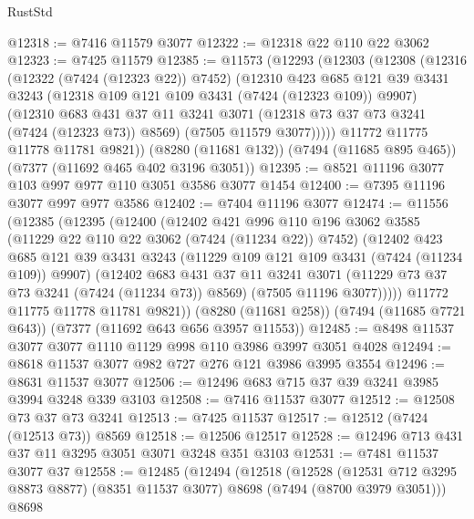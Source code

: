 \begin{lexlean}{RustStd}
\begin{coremodule}
{\begin{coremodule}
{{{{{{{{{{{{{{{{{{{{{{{{{{{{{{{{@12318 := @7416 @11579 @3077
@12322 := @12318 @22 @110 @22 @3062
@12323 := @7425 @11579
@12385 := @11573
    (@12293
      (@12303
        (@12308
          (@12316
            (@12322 (@7424 (@12323 @22)) @7452)
            (@12310
              @423
              @685
              @121
              @39
              @3431
              @3243
              (@12318 @109 @121 @109 @3431 (@7424 (@12323 @109)) @9907)
              (@12310
                @683
                @431
                @37
                @11
                @3241
                @3071
                (@12318 @73 @37 @73 @3241 (@7424 (@12323 @73)) @8569)
                (@7505 @11579 @3077)))))
        @11772
        @11775
        @11778
        @11781
        @9821))
    (@8280 (@11681 @132))
    (@7494 (@11685 @895 @465))
    (@7377 (@11692 @465 @402 @3196 @3051))
@12395 := @8521 @11196 @3077 @103 @997 @977 @110 @3051 @3586 @3077 @1454
@12400 := @7395 @11196 @3077 @997 @977 @3586
@12402 := @7404 @11196 @3077
@12474 := @11556
    (@12385
      (@12395
        (@12400
          (@12402
            @421
            @996
            @110
            @196
            @3062
            @3585
            (@11229 @22 @110 @22 @3062 (@7424 (@11234 @22)) @7452)
            (@12402
              @423
              @685
              @121
              @39
              @3431
              @3243
              (@11229 @109 @121 @109 @3431 (@7424 (@11234 @109)) @9907)
              (@12402
                @683
                @431
                @37
                @11
                @3241
                @3071
                (@11229 @73 @37 @73 @3241 (@7424 (@11234 @73)) @8569)
                (@7505 @11196 @3077)))))
        @11772
        @11775
        @11778
        @11781
        @9821))
    (@8280 (@11681 @258))
    (@7494 (@11685 @7721 @643))
    (@7377 (@11692 @643 @656 @3957 @11553))
@12485 := @8498 @11537 @3077 @3077 @1110 @1129 @998 @110 @3986 @3997 @3051 @4028
@12494 := @8618 @11537 @3077 @982 @727 @276 @121 @3986 @3995 @3554
@12496 := @8631 @11537 @3077
@12506 := @12496 @683 @715 @37 @39 @3241 @3985 @3994 @3248 @339 @3103
@12508 := @7416 @11537 @3077
@12512 := @12508 @73 @37 @73 @3241
@12513 := @7425 @11537
@12517 := @12512 (@7424 (@12513 @73)) @8569
@12518 := @12506 @12517
@12528 := @12496 @713 @431 @37 @11 @3295 @3051 @3071 @3248 @351 @3103
@12531 := @7481 @11537 @3077 @37
@12558 := @12485
    (@12494
      (@12518
        (@12528
          (@12531 @712 @3295 @8873 @8877)
          (@8351 @11537 @3077)
          @8698
          (@7494 (@8700 @3979 @3051)))
        @8698
}}}}}}}}}}}}}}}}}}}}}}}}}}}}}}}}
\end{coremodule}}
\end{coremodule}
\end{lexlean}
